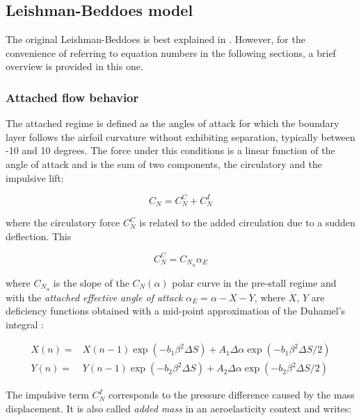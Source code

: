 \subsection{Leishman-Beddoes model}

The original Leishman-Beddoes is best explained in \cite{bangga_improved_2020}. However, for the convenience of referring to equation numbers in the following sections, a brief overview is provided in this one. 

\subsubsection{Attached flow behavior}

The attached regime is defined as the angles of attack for which the boundary layer follows the airfoil curvature without exhibiting separation, typically between -10 and 10 degrees. The force under this conditions is a linear function of the angle of attack and is the sum of two components, the circulatory and the impulsive lift: 

\begin{equation}
C_N = C_N^C + C_N^I
\end{equation}

\noindent where the circulatory force $C_N^C$ is related to the added circulation due to a sudden deflection. This 

\begin{equation}
C_N^C = C_{N_\alpha} \alpha_{E}
\label{eq:circulatory}
\end{equation}

\noindent where $C_{N_\alpha}$ is the slope of the $C_N(\alpha)$ polar curve in the pre-stall regime and with the \textit{attached effective angle of attack} $\alpha_E = \alpha - X - Y$, where $X$, $Y$ are deficiency functions obtained with a mid-point approximation of the Duhamel's integral \cite{leishman_principles_2006}:

\begin{eqnarray}
X(n)= & X(n-1) \exp \left(-b_{1} \beta^{2} \Delta S\right)+A_{1} \Delta \alpha \exp \left(-b_{1} \beta^{2} \Delta S / 2\right) \\
Y(n)= & Y(n-1) \exp \left(-b_{2} \beta^{2} \Delta S\right)+A_{2} \Delta \alpha \exp \left(-b_{2} \beta^{2} \Delta S / 2\right)
\end{eqnarray}

The impulsive term $C_N^I$ corresponds to the pressure difference caused by the mass displacement. It is also called \textit{added mass} in an aeroelasticity context and writes: 

